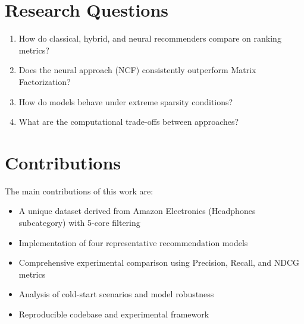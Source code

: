 \section{Research Questions}

\begin{enumerate}
    \item How do classical, hybrid, and neural recommenders compare on ranking metrics?
    \item Does the neural approach (NCF) consistently outperform Matrix Factorization?
    \item How do models behave under extreme sparsity conditions?
    \item What are the computational trade-offs between approaches?
\end{enumerate}

\section{Contributions}

The main contributions of this work are:
\begin{itemize}
    \item A unique dataset derived from Amazon Electronics (Headphones subcategory) with 5-core filtering
    \item Implementation of four representative recommendation models
    \item Comprehensive experimental comparison using Precision, Recall, and NDCG metrics
    \item Analysis of cold-start scenarios and model robustness
    \item Reproducible codebase and experimental framework
\end{itemize}
